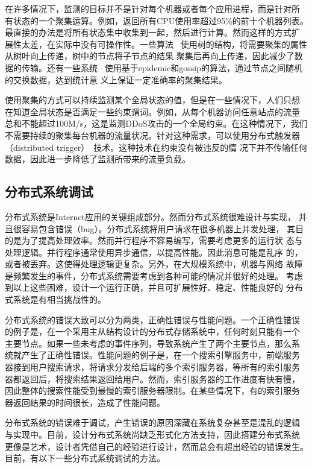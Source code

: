 在许多情况下，监测的目标并不是针对每个机器或者每个应用进程，而是针对所
有状态的一个聚集运算。例如，返回所有CPU使用率超过95\%的前十个机器列表。
最直接的办法是将所有状态集中收集到一起，然后进行计算。然而这样的方式扩
展性太差，在实际中没有可操作性。一些算法~\cite{sdims, somo, sanfermin}
使用树的结构，将需要聚集的属性从树叶向上传递，树中的节点将子节点的结果
聚集后再向上传递，因此减少了数据的传输。还有一些系统~\cite{astrolabe}
使用基于epidemic和gossip的算法，通过节点之间随机的交换数据，达到统计意
义上保证一定准确率的聚集结果。

使用聚集的方式可以持续监测某个全局状态的值，但是在一些情况下，人们只想
在知道全局状态是否满足一些约束谓词。例如，从每个机器访问任意站点的流量
总和不能超过100M/s，这是监测DDoS攻击的一个全局约束。在这种情况下，我们
不需要持续的聚集每台机器的流量状况。针对这种需求，可以使用分布式触发器
（distributed trigger）~\cite{Jain2004, Huang2006, Keralapura2006,
Sharfman2007, Cormode2005, Das2004}技术。这种技术在约束没有被违反的情
况下并不传输任何数据，因此进一步降低了监测所带来的流量负载。

\subsection{分布式系统调试}
\label{sec:intro_debugging}

分布式系统是Internet应用的关键组成部分。然而分布式系统很难设计与实现，
并且很容易包含错误（bug）。分布式系统将用户请求在很多机器上并发处理，
其目的是为了提高处理效率。然而并行程序不容易编写，需要考虑更多的运行状
态与处理逻辑。并行程序通常使用异步通信，以提高性能。因此消息可能是乱序
的，或者被丢弃。这使得处理逻辑更复杂。另外，在大规模系统中，机器与网络
故障是频繁发生的事件，分布式系统需要考虑到各种可能的情况并很好的处理。
考虑到以上这些困难，设计一个运行正确，并且可扩展性好、稳定、性能良好的
分布式系统是有相当挑战性的。

分布式系统的错误大致可以分为两类，正确性错误与性能问题。一个正确性错误
的例子是，在一个采用主从结构设计的分布式存储系统中，任何时刻只能有一个
主要节点。如果一些未考虑的事件序列，导致系统产生了两个主要节点，那么系
统就产生了正确性错误。性能问题的例子是，在一个搜索引擎服务中，前端服务
器接到用户搜索请求，将请求分发给后端的多个索引服务器，等所有的索引服务
器都返回后，将搜索结果返回给用户。然而，索引服务器的工作进度有快有慢，
因此整体的搜索性能受到最慢的索引服务器限制。在某些情况下，有的索引服务
器返回结果的时间很长，造成了性能问题。

分布式系统的错误难于调试，产生错误的原因深藏在系统复杂甚至是混乱的逻辑
与实现中。目前，设计分布式系统尚缺乏形式化方法支持，因此搭建分布式系统
更像是艺术，设计者凭借自己的经验进行设计，然而总会有超出经验的错误发生。
目前，有以下一些分布式系统调试的方法。

